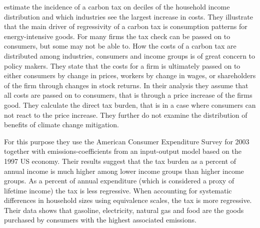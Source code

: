 \cite{Grainger2010} estimate the incidence of a carbon tax on deciles of the household income distribution and which industries see the largest increase in costs. They illustrate that the main driver of regressivity of a carbon tax is consumption patterns for energy-intensive goods. For many firms the tax check can be passed on to consumers, but some may not be able to. How the costs of a carbon tax are distributed among industries, consumers and income groups is of great concern to policy makers. They state that the costs for a firm is ultimately passed on to either consumers by change in prices, workers by change in wages, or shareholders of the firm through changes in stock returns. In their analysis they assume that all costs are passed on to consumers, that is through a price increase of the firms good. They calculate the direct tax burden, that is in a case where consumers can not react to the price increase. They further do not examine the distribution of benefits of climate change mitigation.

For this purpose they use the American Consumer Expenditure Survey for 2003 together with emissions-coefficients from an input-output model based on the 1997 US economy. Their results suggest that the tax burden as a percent of annual income is much higher among lower income groups than higher income groups. As a percent of annual expenditure (which is considered a proxy of lifetime income) the tax is less regressive. When accounting for systematic differences in household sizes using equivalence scales, the tax is more regressive. 
Their data shows that gasoline, electricity, natural gas and food are the goods purchased by consumers with the highest associated emissions. 

%
%
%
